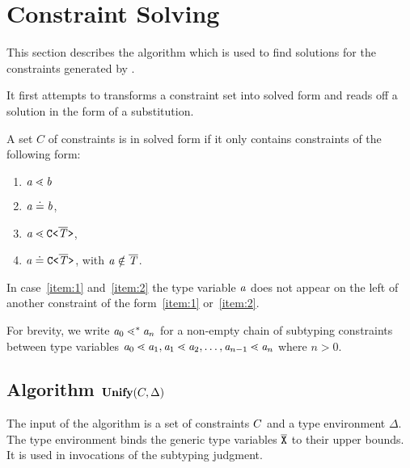 \section{Constraint Solving}
\label{sec:unify}

This section describes the \unify{} algorithm
which is used to find solutions for the constraints generated by \fjtype.

It first attempts to transforms a constraint set into solved form and
reads off a solution in the form of a substitution.

\begin{definition}\label{def:solved-form}
  A set $C$ of constraints is in solved form if it only contains
  constraints of  the following form:
  \begin{enumerate}
  \item $\mathit{ a } \lessdot \mathit{ b }$ %
  \item $\mathit{ a } \doteq \mathit{ b }$,
  \item\label{item:1} $\mathit{ a } \lessdot \mathtt{C \texttt{<} \overline{\tt \mathit{T}} \texttt{>} }$, 
  \item\label{item:2} $\mathit{ a } \doteq \mathtt{C \texttt{<} \overline{\tt \mathit{T}} \texttt{>} }$, with $\mathit{ a } \notin \overline{\tt \mathit{T}}$.
  \end{enumerate}
  In case~\ref{item:1} and~\ref{item:2} the type variable $\mathit{ a }$ does not appear on the left of another constraint of the
  form~\ref{item:1} or~\ref{item:2}.
\end{definition}  

For brevity, we write $\mathit{ a }_0 \lessdot^* \mathit{ a }_n$ for a non-empty chain of subtyping constraints between type variables $\mathit{ a }_0 \lessdot
\mathit{ a }_1, \mathit{ a }_1 \lessdot \mathit{ a }_2, \dots, \mathit{ a }_{n-1} \lessdot \mathit{ a }_n$ where $n>0$.

\subsection{{Algorithm $\textbf{Unify}{} (C, \Delta)$}}


The input of the algorithm is a set of constraints $C$ and a
type environment $\Delta$. The type environment binds the generic type
variables $\overline{\tt X}$ to their upper bounds. It is used in invocations of
the subtyping judgment.

